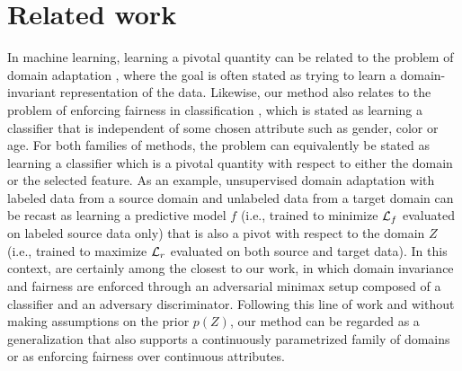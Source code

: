 \documentclass{article}
\theoremstyle{plain}
\begin{document}

\section{Related work}
\label{sec:related}

In machine learning, learning a pivotal quantity can be related to the problem
of domain adaptation
\citep{blitzer2006domain,pan2011domain,gopalan2011domain,gong2013connecting,baktashmotlagh2013unsupervised,ajakan2014domain,ganin2014unsupervised},
where the goal is often stated as trying to learn a domain-invariant
representation of the data. Likewise, our method also relates to the problem of
enforcing fairness in classification
\citep{zemel2013learning,feldman2015certifying,EdwardsS15,zafar2015fairness},
which is stated as learning a classifier that is independent of some chosen
attribute such as gender, color or age. For both families of methods, the
problem can equivalently be stated as learning a classifier which is a pivotal
quantity with respect to either the domain or the selected feature. As an
example, unsupervised domain adaptation with labeled data from a source domain
and unlabeled data from a target domain can be recast as learning a predictive
model $f$ (i.e., trained to minimize ${\cal L}_f$ evaluated on labeled source
data only) that is also a pivot with respect to the domain $Z$ (i.e., trained to
maximize ${\cal L}_r$ evaluated on both source and target data). In this
context, \citep{ganin2014unsupervised,EdwardsS15} are certainly among the
closest to our work, in which domain invariance and fairness are enforced
through an adversarial minimax setup composed of a classifier and an adversary
discriminator. Following this line of work and without making assumptions on the
prior $p(Z)$, our method can be regarded as a generalization that also supports
a continuously parametrized family of domains or as enforcing fairness over
continuous attributes.
\end{document}
